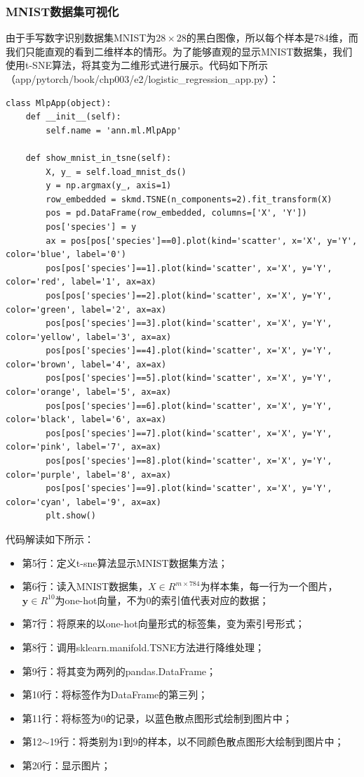 \documentclass[UTF8]{article}
\begin{document}
\subsubsection{MNIST数据集可视化}
由于手写数字识别数据集MNIST为$28 \times 28$的黑白图像，所以每个样本是784维，而我们只能直观的看到二维样本的情形。为了能够直观的显示MNIST数据集，我们使用t-SNE算法，将其变为二维形式进行展示。代码如下所示（app/pytorch/book/chp003/e2/logistic\_regression\_app.py）：
\begin{lstlisting}
class MlpApp(object):
    def __init__(self):
        self.name = 'ann.ml.MlpApp'
    
    def show_mnist_in_tsne(self):
        X, y_ = self.load_mnist_ds()
        y = np.argmax(y_, axis=1)
        row_embedded = skmd.TSNE(n_components=2).fit_transform(X)
        pos = pd.DataFrame(row_embedded, columns=['X', 'Y'])
        pos['species'] = y
        ax = pos[pos['species']==0].plot(kind='scatter', x='X', y='Y', color='blue', label='0')
        pos[pos['species']==1].plot(kind='scatter', x='X', y='Y', color='red', label='1', ax=ax)
        pos[pos['species']==2].plot(kind='scatter', x='X', y='Y', color='green', label='2', ax=ax)
        pos[pos['species']==3].plot(kind='scatter', x='X', y='Y', color='yellow', label='3', ax=ax)
        pos[pos['species']==4].plot(kind='scatter', x='X', y='Y', color='brown', label='4', ax=ax)
        pos[pos['species']==5].plot(kind='scatter', x='X', y='Y', color='orange', label='5', ax=ax)
        pos[pos['species']==6].plot(kind='scatter', x='X', y='Y', color='black', label='6', ax=ax)
        pos[pos['species']==7].plot(kind='scatter', x='X', y='Y', color='pink', label='7', ax=ax)
        pos[pos['species']==8].plot(kind='scatter', x='X', y='Y', color='purple', label='8', ax=ax)
        pos[pos['species']==9].plot(kind='scatter', x='X', y='Y', color='cyan', label='9', ax=ax)
        plt.show()
\end{lstlisting}
代码解读如下所示：
\begin{itemize}
\item 第5行：定义t-sne算法显示MNIST数据集方法；
\item 第6行：读入MNIST数据集，$X \in R^{m \times 784}$为样本集，每一行为一个图片，$\boldsymbol{y} \in R^{10}$为one-hot向量，不为0的索引值代表对应的数据；
\item 第7行：将原来的以one-hot向量形式的标签集，变为索引号形式；
\item 第8行：调用sklearn.manifold.TSNE方法进行降维处理；
\item 第9行：将其变为两列的pandas.DataFrame；
\item 第10行：将标签作为DataFrame的第三列；
\item 第11行：将标签为0的记录，以蓝色散点图形式绘制到图片中；
\item 第12$\sim$19行：将类别为1到9的样本，以不同颜色散点图形大绘制到图片中；
\item 第20行：显示图片；
\end{itemize}
\end{document}

